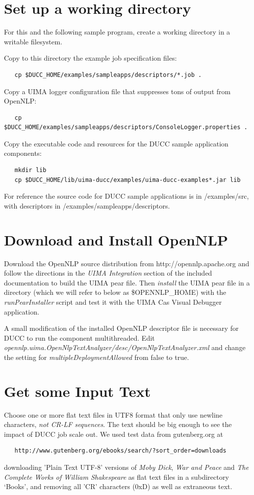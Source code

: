 \section{Set up a working directory}
For this and the following sample program, create a working directory in a writable filesystem.

Copy to this directory the example job specification files:
\begin{verbatim}
   cp $DUCC_HOME/examples/sampleapps/descriptors/*.job .
\end{verbatim}

Copy a UIMA logger configuration file that suppresses tons of output from OpenNLP:
\begin{verbatim}
   cp $DUCC_HOME/examples/sampleapps/descriptors/ConsoleLogger.properties .
\end{verbatim}

Copy the executable code and resources for the DUCC sample application components:
\begin{verbatim}
   mkdir lib
   cp $DUCC_HOME/lib/uima-ducc/examples/uima-ducc-examples*.jar lib
\end{verbatim}

For reference the source code for DUCC sample applications is in \ducchome/examples/src,
with descriptors in \ducchome/examples/sampleapps/descriptors.

\section{Download and Install OpenNLP}
Download the OpenNLP source distribution from http://opennlp.apache.org and follow the directions in the
{\em UIMA Integration} section of the included documentation to build the UIMA pear file.
Then {\em install} the UIMA pear file in a directory (which we will refer to below as \$OPENNLP\_HOME) 
with the {\em runPearInstaller} script and
test it with the UIMA Cas Visual Debugger application.

A small modification of the installed OpenNLP descriptor file
is necessary for DUCC to run the component multithreaded. 
Edit {\em opennlp.uima.OpenNlpTextAnalyzer/desc/OpenNlpTextAnalyzer.xml}
and change the setting for {\em multipleDeploymentAllowed} from false to true.

\section{Get some Input Text}
Choose one or more flat text files in UTF8 format that only use newline characters,
{\em not CR-LF sequences}.
The text should be big enough to see the impact of DUCC job scale out.
We used test data from gutenberg.org at
\begin{verbatim}
   http://www.gutenberg.org/ebooks/search/?sort_order=downloads
\end{verbatim}
downloading 'Plain Text UTF-8' versions of {\em Moby Dick}, {\em War and Peace} and {\em The Complete Works of William Shakespeare} 
as flat text files in
a subdirectory `Books', and removing all 'CR' characters (0xD) as well as extraneous text.

